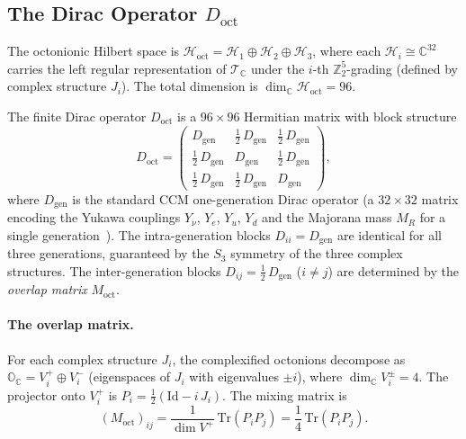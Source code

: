 \subsection{The Dirac Operator \texorpdfstring{$D_{\mathrm{oct}}$}{D\_oct}}
\label{sec:4-doct}

The octonionic Hilbert space is $\mathcal{H}_{\mathrm{oct}} = \mathcal{H}_1 \oplus \mathcal{H}_2 \oplus \mathcal{H}_3$, where each $\mathcal{H}_i \cong \mathbb{C}^{32}$ carries the left regular representation of $\mathcal{T}_{\mathbb{C}}$ under the $i$-th $\mathbb{Z}_2^5$-grading (defined by complex structure $J_i$). The total dimension is $\dim_{\mathbb{C}} \mathcal{H}_{\mathrm{oct}} = 96$.

The finite Dirac operator $D_{\mathrm{oct}}$ is a $96 \times 96$ Hermitian matrix with block structure
\begin{equation}
  D_{\mathrm{oct}} = \begin{pmatrix}
    D_{\mathrm{gen}} & \tfrac{1}{2}\, D_{\mathrm{gen}} & \tfrac{1}{2}\, D_{\mathrm{gen}} \\[4pt]
    \tfrac{1}{2}\, D_{\mathrm{gen}} & D_{\mathrm{gen}} & \tfrac{1}{2}\, D_{\mathrm{gen}} \\[4pt]
    \tfrac{1}{2}\, D_{\mathrm{gen}} & \tfrac{1}{2}\, D_{\mathrm{gen}} & D_{\mathrm{gen}}
  \end{pmatrix},
  \label{eq:4-80}
\end{equation}
where $D_{\mathrm{gen}}$ is the standard CCM one-generation Dirac operator (a $32 \times 32$ matrix encoding the Yukawa couplings $Y_\nu$, $Y_e$, $Y_u$, $Y_d$ and the Majorana mass $M_R$ for a single generation~\cite{ch4:CCM2007,ch4:vanSuijlekom2024}). The intra-generation blocks $D_{ii} = D_{\mathrm{gen}}$ are identical for all three generations, guaranteed by the $S_3$ symmetry of the three complex structures. The inter-generation blocks $D_{ij} = \tfrac{1}{2}\, D_{\mathrm{gen}}$ ($i \neq j$) are determined by the \emph{overlap matrix} $M_{\mathrm{oct}}$.

\paragraph{The overlap matrix.}
For each complex structure $J_i$, the complexified octonions decompose as $\mathbb{O}_{\mathbb{C}} = V_i^+ \oplus V_i^-$ (eigenspaces of $J_i$ with eigenvalues $\pm i$), where $\dim_{\mathbb{C}} V_i^{\pm} = 4$. The projector onto $V_i^+$ is $P_i = \tfrac{1}{2}(\mathrm{Id} - i\, J_i)$. The mixing matrix is
\begin{equation}
  (M_{\mathrm{oct}})_{ij} = \frac{1}{\dim V^+}\, \mathrm{Tr}(P_i P_j) = \frac{1}{4}\, \mathrm{Tr}(P_i P_j).
  \label{eq:4-81}
\end{equation}

